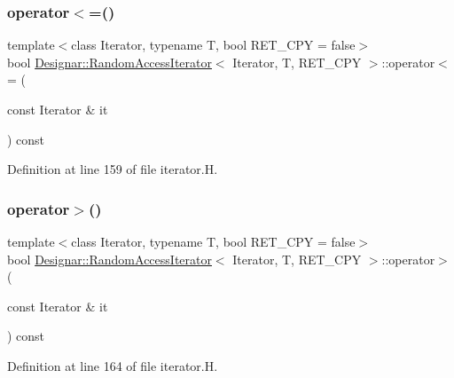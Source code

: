 \subsubsection{\texorpdfstring{operator$<$=()}{operator<=()}}
{\footnotesize\ttfamily template$<$class Iterator, typename T, bool R\+E\+T\+\_\+\+C\+PY = false$>$ \\
bool \hyperlink{class_designar_1_1_random_access_iterator}{Designar\+::\+Random\+Access\+Iterator}$<$ Iterator, T, R\+E\+T\+\_\+\+C\+PY $>$\+::operator$<$= (\begin{DoxyParamCaption}\item[{const Iterator \&}]{it }\end{DoxyParamCaption}) const\hspace{0.3cm}{\ttfamily [inline]}}



Definition at line 159 of file iterator.\+H.

\mbox{\label{class_designar_1_1_random_access_iterator_a4d72737c88579cc302bc91d3520150fa}} 
\subsubsection{\texorpdfstring{operator$>$()}{operator>()}}
{\footnotesize\ttfamily template$<$class Iterator, typename T, bool R\+E\+T\+\_\+\+C\+PY = false$>$ \\
bool \hyperlink{class_designar_1_1_random_access_iterator}{Designar\+::\+Random\+Access\+Iterator}$<$ Iterator, T, R\+E\+T\+\_\+\+C\+PY $>$\+::operator$>$ (\begin{DoxyParamCaption}\item[{const Iterator \&}]{it }\end{DoxyParamCaption}) const\hspace{0.3cm}{\ttfamily [inline]}}



Definition at line 164 of file iterator.\+H.

\mbox{\label{class_designar_1_1_random_access_iterator_a38642462d4d39e78533715d41e949a6a}} 
